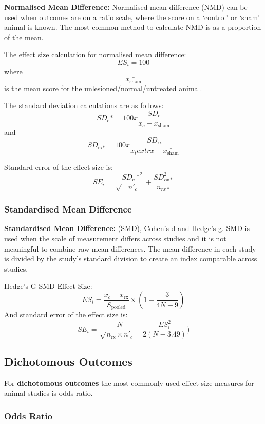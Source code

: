 \documentclass[
]{book}
\begin{document}
\textbf{Normalised Mean Difference:} Normalised mean difference (NMD) can be used when outcomes are on a ratio scale, where the score on a `control' or `sham' animal is known. The most common method to calculate NMD is as a proportion of the mean.

The effect size calculation for normalised mean difference:
\[ES_i= 100%
\] where \[\bar{x_\text{sham}} \] is the mean score for the unlesioned/normal/untreated animal.

The standard deviation calculations are as follows:
\[SD_c* = 100 x \frac {SD_c}{\bar{x_c} - \bar{x_\text{sham}}} \] and \[SD_\text{rx*} = 100 x \frac {SD_\text{rx}}{\bar{x_text{rx}} - \bar{x_\text{sham}}}\]

Standard error of the effect size is:
\[SE_i = \sqrt \frac{SD_c*^2}{n'_c} + \frac {SD_{rx*}^2}{n_{rx*}} \]

\hypertarget{standardised-mean-difference}{%
\subsubsection{Standardised Mean Difference}\label{standardised-mean-difference}}

\textbf{Standardised Mean Difference:} (SMD), Cohen's d and Hedge's g. SMD is used when the scale of measurement differs across studies and it is not meaningful to combine raw mean differences. The mean difference in each study is divided by the study's standard division to create an index comparable across studies.

Hedge's G SMD Effect Size:
\[ES_i = \frac {\bar{x_c} - \bar{x_\text{rx}}}{S_{\text{pooled}}} \times (1 - \frac{3}{4N - 9})  \]
And standard error of the effect size is:
\[ SE_i = \sqrt \frac{N}{n_{\text{rx}} \times n'_c} + \frac{ES_i^2}{2(N - 3.49)})\]

\hypertarget{dichotomous-outcomes}{%
\subsection{Dichotomous Outcomes}\label{dichotomous-outcomes}}

For \textbf{dichotomous outcomes} the most commonly used effect size measures for animal studies is odds ratio.

\hypertarget{odds-ratio}{%
\subsubsection{Odds Ratio}\label{odds-ratio}}
\end{document}
